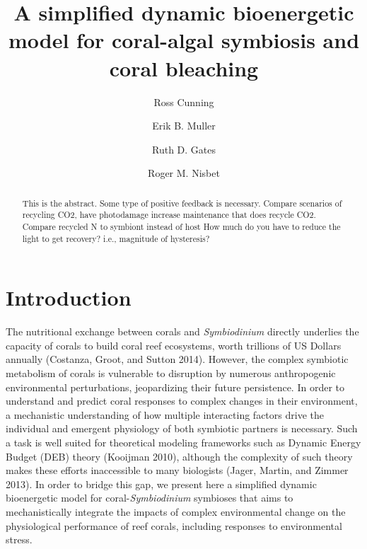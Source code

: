 \documentclass[]{elsarticle} %
\begin{document}
\begin{frontmatter}

  \title{A simplified dynamic bioenergetic model for coral-algal symbiosis and
coral bleaching}
    \author[University of Hawaii]{Ross Cunning}
    \author[University of California]{Erik B. Muller}
  
  
    \author[University of Hawaii]{Ruth D. Gates}
  
  
    \author[University of California]{Roger M. Nisbet}
  
  
      \address[University of Hawaii]{Hawaii Institute of Marine Biology, Kaneohe, HI 96744, USA}
    \address[University of California]{Department of Ecology, Evolution, and Marine Biology, Santa Barbara, CA
93106, USA}
  
  \begin{abstract}
  This is the abstract. Some type of positive feedback is necessary.
  Compare scenarios of recycling CO2, have photodamage increase
  maintenance that does recycle CO2. Compare recycled N to symbiont
  instead of host How much do you have to reduce the light to get
  recovery? i.e., magnitude of hysteresis?
  \end{abstract}
  
 \end{frontmatter}

\section{Introduction}\label{introduction}

The nutritional exchange between corals and \emph{Symbiodinium} directly
underlies the capacity of corals to build coral reef ecosystems, worth
trillions of US Dollars annually (Costanza, Groot, and Sutton 2014).
However, the complex symbiotic metabolism of corals is vulnerable to
disruption by numerous anthropogenic environmental perturbations,
jeopardizing their future persistence. In order to understand and
predict coral responses to complex changes in their environment, a
mechanistic understanding of how multiple interacting factors drive the
individual and emergent physiology of both symbiotic partners is
necessary. Such a task is well suited for theoretical modeling
frameworks such as Dynamic Energy Budget (DEB) theory (Kooijman 2010),
although the complexity of such theory makes these efforts inaccessible
to many biologists (Jager, Martin, and Zimmer 2013). In order to bridge
this gap, we present here a simplified dynamic bioenergetic model for
coral-\emph{Symbiodinium} symbioses that aims to mechanistically
integrate the impacts of complex environmental change on the
physiological performance of reef corals, including responses to
environmental stress.
\end{document}

